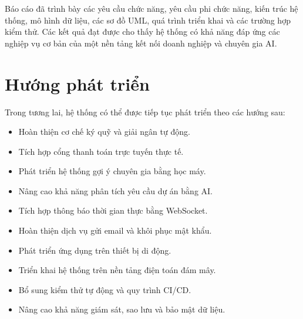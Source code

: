 \documentclass[14pt,a4paper,oneside]{extreport}
\begin{document}
Báo cáo đã trình bày các yêu cầu chức năng, yêu cầu phi chức năng, kiến trúc
hệ thống, mô hình dữ liệu, các sơ đồ UML, quá trình triển khai và các trường
hợp kiểm thử. Các kết quả đạt được cho thấy hệ thống có khả năng đáp ứng các
nghiệp vụ cơ bản của một nền tảng kết nối doanh nghiệp và chuyên gia AI.

\section*{Hướng phát triển}

Trong tương lai, hệ thống có thể được tiếp tục phát triển theo các hướng sau:

\begin{itemize}
    \item Hoàn thiện cơ chế ký quỹ và giải ngân tự động.
    \item Tích hợp cổng thanh toán trực tuyến thực tế.
    \item Phát triển hệ thống gợi ý chuyên gia bằng học máy.
    \item Nâng cao khả năng phân tích yêu cầu dự án bằng AI.
    \item Tích hợp thông báo thời gian thực bằng WebSocket.
    \item Hoàn thiện dịch vụ gửi email và khôi phục mật khẩu.
    \item Phát triển ứng dụng trên thiết bị di động.
    \item Triển khai hệ thống trên nền tảng điện toán đám mây.
    \item Bổ sung kiểm thử tự động và quy trình CI/CD.
    \item Nâng cao khả năng giám sát, sao lưu và bảo mật dữ liệu.
\end{itemize}

\clearpage


\printbibliography[
    heading=bibintoc,
    title={Tài liệu tham khảo}
]

\clearpage


\appendix

\end{document}
